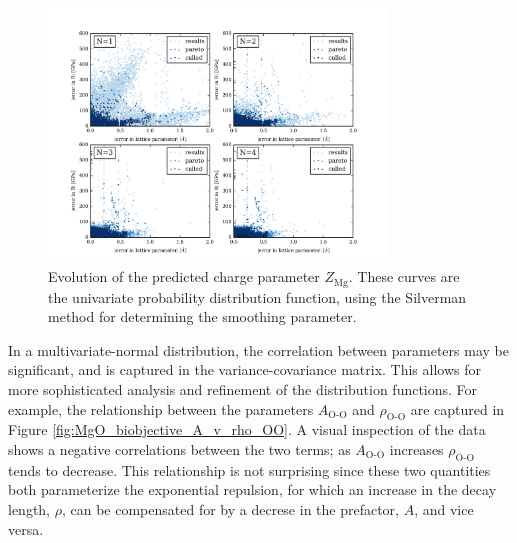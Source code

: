 \begin{figure}[ht]
	\centering
  \includegraphics[width=0.8\textwidth]{chapter7/MgO_biobjective_evolution}
  \caption{Evolution of the predicted charge parameter $Z_{\text{Mg}}$.  These curves are the univariate probability distribution function, using the Silverman method for determining the smoothing parameter.}
  \label{fig:MgO_biobjective_evolution}
\end{figure}

In a multivariate-normal distribution, the correlation between parameters may be significant, and is captured in the variance-covariance matrix. This allows for more sophisticated analysis and refinement of the distribution functions. For example, the relationship between the parameters $A_{\text{O-O}}$ and $\rho_{\text{O-O}}$ are captured in Figure \ref{fig:MgO_biobjective_A_v_rho_OO}.  A visual inspection of the data shows a negative correlations between the two terms; as $A_{\text{O-O}}$ increases  $\rho_{\text{O-O}}$ tends to decrease.  This relationship is not surprising since these two quantities both parameterize the exponential repulsion, for which an increase in the decay length, $\rho$, can be compensated for by a decrese in the prefactor, $A$, and vice versa.

